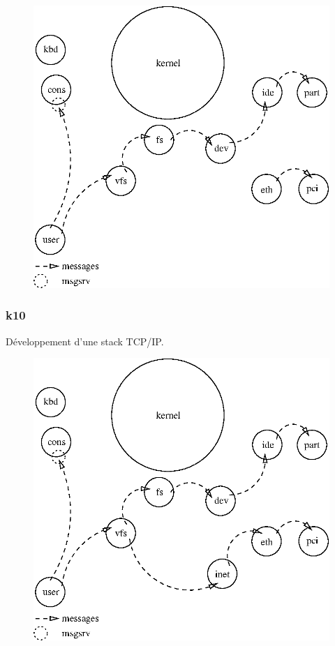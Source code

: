 \documentclass[10pt,a4wide]{article}
\begin{document}
\begin{figure}[h]
\centerline{\includegraphics{figures/k9.eps}}
\end{figure}

\newpage

\subsubsection{k10}

D\'eveloppement d'une stack TCP/IP.

\vspace{5cm}

\begin{figure}[h]
\centerline{\includegraphics{figures/k10.eps}}
\end{figure}
\end{document}
